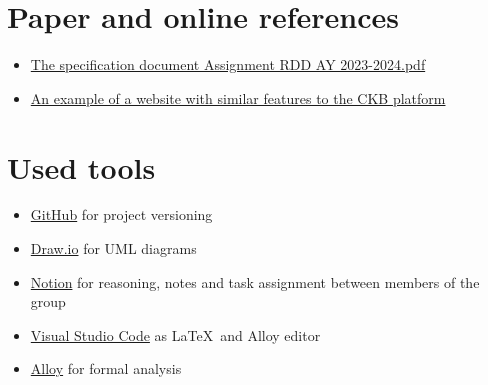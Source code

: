 \section{Paper and online references}
\label{sec:paper_references}%
\begin{itemize}
    \item \href{https://polimi365-my.sharepoint.com/:b:/g/personal/10710351_polimi_it/EZXUPFfeFKdBkf5M8W-EBYgB2JrrVLr23BYJ4MXQ7kzUkA?e=o0wvyw}{The specification document Assignment RDD AY 2023-2024.pdf}
    \item \href{https://www.codewars.com/}{An example of a website with similar features to the CKB platform}
\end{itemize}


\section{Used tools}
\label{sec:used_tools}%
\begin{itemize}
    \item \href{https://github.com/}{GitHub} for project versioning
    \item \href{https://draw.io/}{Draw.io} for UML diagrams
    \item \href{https://www.notion.so/}{Notion} for reasoning, notes and task assignment between members of the group
    \item \href{https://code.visualstudio.com/}{Visual Studio Code} as \LaTeX\ and Alloy editor
    \item \href{https://alloytools.org/}{Alloy} for formal analysis
\end{itemize}
